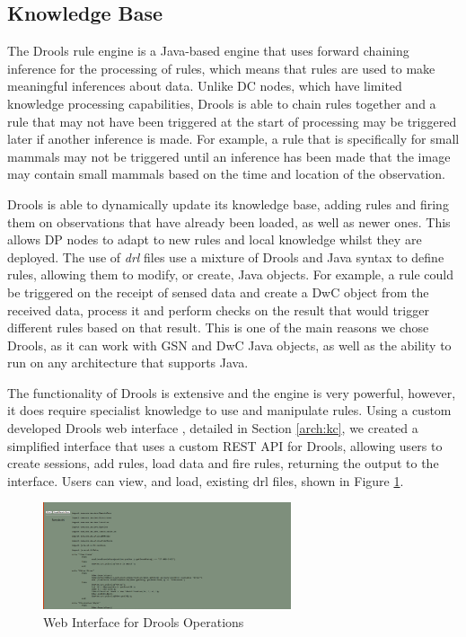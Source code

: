 		
	
	\subsection{Knowledge Base}\label{arch:kb}
	The Drools rule engine is a Java-based engine that uses forward chaining inference for the processing of rules, which means that rules are used to make meaningful inferences about data. Unlike DC nodes, which have limited knowledge processing capabilities, Drools is able to chain rules together and a rule that may not have been triggered at the start of processing may be triggered later if another inference is made. For example, a rule that is specifically for small mammals may not be triggered until an inference has been made that the image may contain small mammals based on the time and location of the observation.
	
	Drools is able to dynamically update its knowledge base, adding rules and firing them on observations that have already been loaded, as well as newer ones. This allows DP nodes to adapt to new rules and local knowledge whilst they are deployed. The use of \textit{drl} files use a mixture of Drools and Java syntax to define rules, allowing them to modify, or create, Java objects. For example, a rule could be triggered on the receipt of sensed data and create a DwC object from the received data, process it and perform checks on the result that would trigger different rules based on that result. This is one of the main reasons we chose Drools, as it can work with GSN and DwC Java objects, as well as the ability to run on any architecture that supports Java.
	
	The functionality of Drools is extensive and the engine is very powerful, however, it does require specialist knowledge to use and manipulate rules. Using a custom developed Drools web interface , detailed in Section \ref{arch:kc}, we created a simplified interface that uses a custom REST API for Drools, allowing users to create sessions, add rules, load data and fire rules, returning the output to the interface. Users can view, and load, existing drl files, shown in Figure \ref{kc:rloris_drl}. 
	
		\begin{figure}[h]
		\centering
		\includegraphics[width=0.65\textwidth]{Chap4/figures/rules}
		\caption{Web Interface for Drools Operations}
		\label{kc:rloris_drl}
		\end{figure}
	
